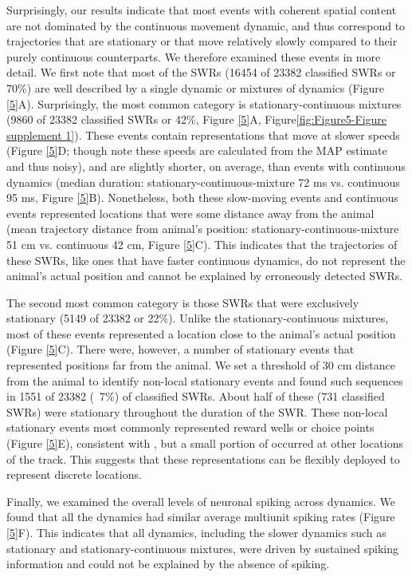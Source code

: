 \documentclass[times, twoside]{zHenriquesLab-StyleBioRxiv}
\begin{document}
Surprisingly, our results indicate that most events with coherent spatial content are not dominated by the continuous movement dynamic, and thus correspond to trajectories that are stationary or that move relatively slowly compared to their purely continuous counterparts. We therefore examined these events in more detail. We first note that most of the SWRs (16454 of 23382 classified SWRs or 70\%) are well described by a single dynamic or mixtures of dynamics (Figure \ref{5}A). Surprisingly, the most common category is stationary-continuous mixtures (9860 of 23382 classified SWRs or 42\%, Figure \ref{5}A, Figure\ref{fig:Figure5-Figure supplement 1}). These events contain representations that move at slower speeds (Figure \ref{5}D; though note these speeds are calculated from the MAP estimate and thus noisy), and are slightly shorter, on average, than events with continuous dynamics (median duration: stationary-continuous-mixture 72 ms vs. continuous 95 ms, Figure \ref{5}B). Nonetheless, both these slow-moving events and continuous events represented locations that were some distance away from the animal (mean trajectory distance from animal's position: stationary-continuous-mixture 51 cm vs. continuous 42 cm, Figure \ref{5}C). This indicates that the trajectories of these SWRs, like ones that have faster continuous dynamics, do not represent the animal's actual position and cannot be explained by erroneously detected SWRs.

The second most common category is those SWRs that were exclusively stationary (5149 of 23382 or 22\%). Unlike the stationary-continuous mixtures, most of these events represented a location close to the animal's actual position (Figure \ref{5}C). There were, however, a number of stationary events that represented positions far from the animal. We set a threshold of 30 cm distance from the animal to identify non-local stationary events and found such sequences in 1551 of 23382 (~7\%) of classified SWRs. About half of these (731 classified SWRs) were stationary throughout the duration of the SWR. These non-local stationary events most commonly represented reward wells or choice points (Figure \ref{5}E), consistent with \cite{JaiDistincthippocampalcorticalmemory2017}, but a small portion of occurred at other locations of the track. This suggests that these representations can be flexibly deployed to represent discrete locations.

Finally, we examined the overall levels of neuronal spiking across dynamics. We found that all the dynamics had similar average multiunit spiking rates (Figure \ref{5}F). This indicates that all dynamics, including the slower dynamics such as stationary and stationary-continuous mixtures, were driven by sustained spiking information and could not be explained by the absence of spiking.
\end{document}
